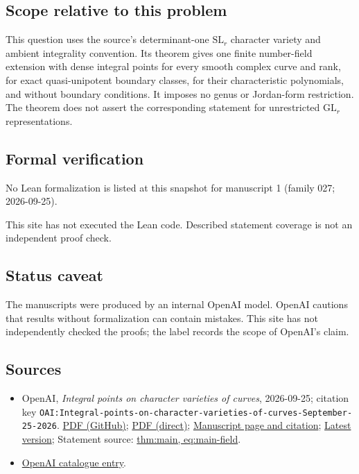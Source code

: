 \documentclass[11pt]{article}
\begin{document}
\subsection{Scope relative to this problem}
This question uses the source's determinant-one $\mathrm{SL}_r$ character variety and ambient integrality convention. Its theorem gives one finite number-field extension with dense integral points for every smooth complex curve and rank, for exact quasi-unipotent boundary classes, for their characteristic polynomials, and without boundary conditions. It imposes no genus or Jordan-form restriction. The theorem does not assert the corresponding statement for unrestricted $\mathrm{GL}_r$ representations.

\subsection{Formal verification}
No Lean formalization is listed at this snapshot for manuscript 1 (family 027; 2026-09-25).

This site has not executed the Lean code. Described statement coverage is not an independent proof check.

\subsection{Status caveat}
The manuscripts were produced by an internal OpenAI model. OpenAI cautions that results without formalization can contain mistakes. This site has not independently checked the proofs; the label records the scope of OpenAI's claim.

\subsection{Sources}
\begin{itemize}
\item OpenAI, \emph{Integral points on character varieties of curves}, 2026-09-25; citation key \texttt{OAI:Integral-points-on-character-varieties-of-curves-September-25-2026}. \href{https://github.com/openai/math/blob/adc7f1241b42e322a6451854ab7e4b4c146bf78a/preprints/Integral-points-on-character-varieties-of-curves-September-25-2026/paper.pdf}{PDF (GitHub)}; \href{https://github.com/openai/math/raw/adc7f1241b42e322a6451854ab7e4b4c146bf78a/preprints/Integral-points-on-character-varieties-of-curves-September-25-2026/paper.pdf}{PDF (direct)}; \href{https://github.com/openai/math/blob/adc7f1241b42e322a6451854ab7e4b4c146bf78a/preprints/Integral-points-on-character-varieties-of-curves-September-25-2026/README.md}{Manuscript page and citation}; \href{https://github.com/openai/math/blob/main/preprints/Integral-points-on-character-varieties-of-curves-September-25-2026/paper.pdf}{Latest version}; Statement source: \href{https://github.com/openai/math/blob/adc7f1241b42e322a6451854ab7e4b4c146bf78a/preprints/Integral-points-on-character-varieties-of-curves-September-25-2026/build/sections/introduction.tex\#L35}{thm:main, eq:main-field}.
\item \href{https://github.com/openai/math/blob/adc7f1241b42e322a6451854ab7e4b4c146bf78a/CONTENTS.md}{OpenAI catalogue entry}.
\end{itemize}
\end{document}
